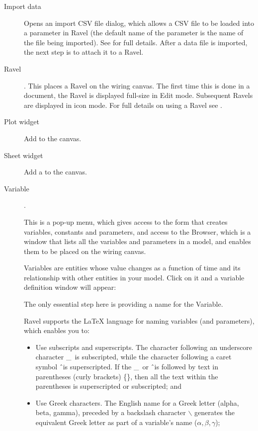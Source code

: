 \begin{description}
\item[Import data]  Opens an import CSV file dialog, which allows a CSV file to be loaded into a parameter in Ravel (the default name of the parameter is the name of the file being imported). See  for full details. After a data file is imported, the next step is to attach it to a Ravel.

\item[Ravel] . This places a Ravel on the wiring canvas. The first time this is done in a document, the Ravel is displayed full-size in Edit mode. Subsequent Ravels are displayed in icon mode. For full details on using a Ravel see .
  
\item[Plot widget]  Add  to the canvas.

\item[Sheet widget]  Add a  to the canvas.

\item[Variable]  . \label{Variable}

This is a pop-up menu, which gives access to the form that creates variables, constants and parameters, and access to the Browser, which is a window that lists all the variables and parameters in a model, and enables them to be placed on the wiring canvas.

Variables are entities whose value changes as a function of time and its relationship with other entities in your model. Click on it and a variable definition window will appear:

\begin{center}
\end{center}

The only essential step here is providing a name for the Variable.

Ravel supports the LaTeX language for naming variables (and parameters), which enables you to:

\begin{itemize}
\item Use subscripts and superscripts. The character following an underscore character \_\ is subscripted, while the character following a caret symbol \^\ is superscripted. If the \_\ or \^\ is followed by text in parentheses (curly brackets) \{\}, then all the text within the parentheses is superscripted or subscripted; and
\item Use Greek characters. The English name for a Greek letter (alpha, beta, gamma), preceded by a backslash character $\backslash$ generates the equivalent Greek letter as part of a variable's name  ($\alpha, \beta, \gamma$);


\end{itemize}
\end{description}
